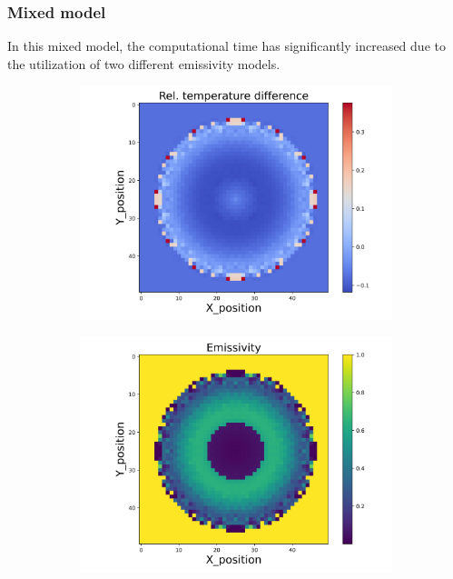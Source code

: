 \subsubsection{Mixed model}
In this mixed model, the computational time has significantly increased 
due to the utilization of two different emissivity models.

\begin{figure}[htbp]
    \centering
    \begin{minipage}{\textwidth}
        \centering
        \begin{subfigure}{0.49\textwidth}
            \centering
            \includegraphics[width=\textwidth]{figures/raw_data/31/mix/T_bias.jpg}
        \end{subfigure}
        \begin{subfigure}{0.49\textwidth}
            \centering
            \includegraphics[width=\textwidth]{figures/raw_data/31/mix/emi_cal.jpg}

\end{subfigure}
\end{minipage}
\end{figure}
